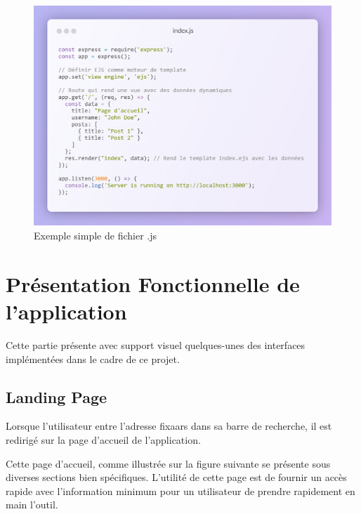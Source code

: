 \begin{figure}[H]
\begin{center}
\includegraphics[width=15cm]{assets/presentation/ejs2-snippet.png}
\end{center}
\caption{Exemple simple de fichier .js}
\end{figure}


\section{Présentation Fonctionnelle de l'application}

Cette partie présente avec support visuel quelques-unes des interfaces implémentées dans le cadre de ce projet. 

\subsection{Landing Page}

Lorsque l'utilisateur entre l'adresse fixaars dans sa barre de recherche, il est redirigé sur la page d'accueil de l'application. 

\vspace{1cm}

Cette page d'accueil, comme illustrée sur la figure suivante se présente sous diverses sections bien spécifiques. L'utilité de cette page est de fournir un accès rapide avec l'information minimum pour un utilisateur de prendre rapidement en main l'outil. 


